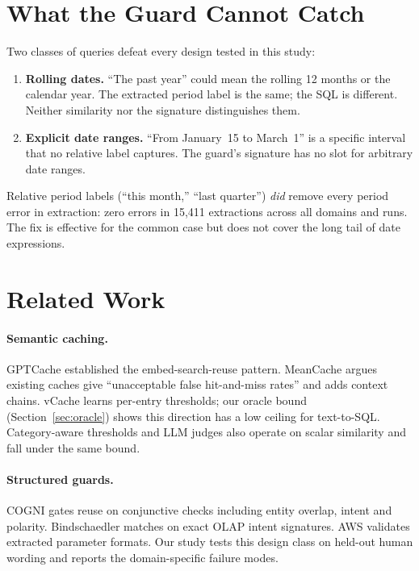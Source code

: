 \documentclass[11pt,a4paper]{article}
\begin{document}
\section{What the Guard Cannot Catch}
\label{sec:residual}

Two classes of queries defeat every design tested in this study:

\begin{enumerate}[leftmargin=*,itemsep=2pt]
\item \textbf{Rolling dates.} ``The past year'' could mean the rolling 12
      months or the calendar year. The extracted period label is the same;
      the SQL is different. Neither similarity nor the signature
      distinguishes them.

\item \textbf{Explicit date ranges.} ``From January~15 to March~1'' is a
      specific interval that no relative label captures. The guard's
      signature has no slot for arbitrary date ranges.
\end{enumerate}

\noindent
Relative period labels (``this month,'' ``last quarter'') \emph{did}
remove every period error in extraction: zero errors in 15,411
extractions across all domains and runs. The fix is effective for the
common case but does not cover the long tail of date expressions.

\section{Related Work}
\label{sec:related}

\paragraph{Semantic caching.} GPTCache \cite{bang2023gptcache} established
the embed-search-reuse pattern. MeanCache \cite{gill2025meancache} argues
existing caches give ``unacceptable false hit-and-miss rates'' and adds
context chains. vCache \cite{schroeder2026vcache} learns per-entry
thresholds; our oracle bound (Section~\ref{sec:oracle}) shows this
direction has a low ceiling for text-to-SQL. Category-aware thresholds
\cite{wang2025category} and LLM judges \cite{singh2026krites} also operate
on scalar similarity and fall under the same bound.

\paragraph{Structured guards.} COGNI \cite{rathore2026cogni} gates reuse
on conjunctive checks including entity overlap, intent and polarity.
Bindschaedler \cite{bindschaedler2026semantic} matches on exact OLAP
intent signatures. AWS \cite{brukau2026aws} validates extracted parameter
formats. Our study tests this design class on held-out human wording and
reports the domain-specific failure modes.
\end{document}
